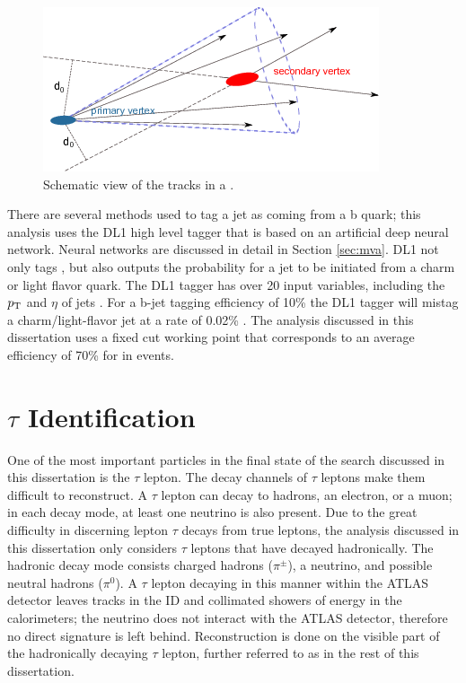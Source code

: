 			\begin{figure}[!ht]
			\centering
			\includegraphics[width=.5\textwidth,keepaspectratio=true]{chapters/chapter5_eventreconnstruction/images/b-jet-schetch.png}
			\caption{\label{fig:bjet} Schematic view of the tracks in a \bjet \cite{bjet-trigger}.}
			\end{figure}

			There are several methods used to tag a jet as coming from a b quark; this analysis uses the DL1 high level tagger \cite{b-tagging} that is based on an artificial deep neural network. Neural networks are discussed in detail in Section \ref{sec:mva}. DL1 not only tags \bjets, but also outputs the probability for a jet to be initiated from a charm or light flavor quark. The DL1 tagger has over 20 input variables, including the $p_{\text{T}}$ and $\eta$ of jets \cite{b-tagging-input-variables}. For a b-jet tagging efficiency of 10\% the DL1 tagger will mistag a charm/light-flavor jet at a rate of 0.02\% \cite{b-tagging}. The analysis discussed in this dissertation uses a fixed cut working point that corresponds to an average efficiency of 70\% for \bjets in \ttbar events. 

	\section{$\tau$ Identification}\label{ssec:reco-tau}
		One of the most important particles in the final state of the search discussed in this dissertation is the $\tau$ lepton. The decay channels of $\tau$ leptons make them difficult to reconstruct. A $\tau$ lepton can decay to hadrons, an electron, or a muon; in each decay mode, at least one neutrino is also present. Due to the great difficulty in discerning lepton $\tau$ decays from true leptons, the analysis discussed in this dissertation only considers $\tau$ leptons that have decayed hadronically. The hadronic decay mode consists charged hadrons ($\pi^{\pm}$), a neutrino, and possible neutral hadrons ($\pi^0$). A $\tau$ lepton decaying in this manner within the \gls{ATLAS} detector leaves tracks in the \gls{ID} and collimated showers of energy in the calorimeters; the neutrino does not interact with the \gls{ATLAS} detector, therefore no direct signature is left behind. Reconstruction is done on the visible part of the hadronically decaying $\tau$ lepton, further referred to as \tauhad in the rest of this dissertation. 


